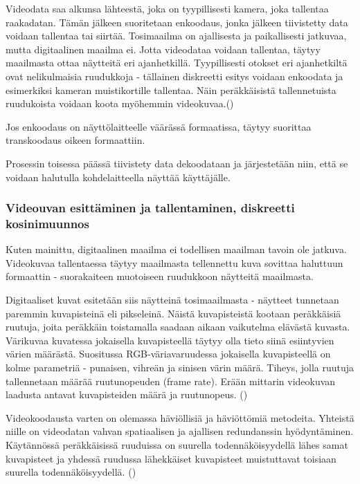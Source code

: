 Videodata saa alkunsa lähteestä, joka on tyypillisesti kamera, joka tallentaa
raakadatan. Tämän jälkeen suoritetaan enkoodaus, jonka jälkeen tiivistetty data
voidaan tallentaa tai siirtää. Tosimaailma on ajallisesta ja paikallisesti jatkuvaa,
mutta digitaalinen maailma ei. Jotta videodataa voidaan tallentaa, täytyy
maailmasta ottaa näytteitä eri ajanhetkillä. Tyypillisesti otokset eri ajanhetkiltä
ovat nelikulmaisia ruudukkoja - tällainen diskreetti esitys voidaan enkoodata
ja esimerkiksi kameran muistikortille tallentaa. Näin peräkkäisistä tallennetuista
ruudukoista voidaan koota myöhemmin videokuvaa.(\cite{h264})

Jos enkoodaus on näyttölaitteelle väärässä
formaatissa, täytyy suorittaa transkoodaus oikeen formaattiin.

Prosessin toisessa päässä tiivistety data dekoodataan ja järjestetään niin, että
se voidaan halutulla kohdelaitteella näyttää käyttäjälle.

\subsubsection{Videouvan esittäminen ja tallentaminen, diskreetti kosinimuunnos}

Kuten mainittu, digitaalinen maailma ei todellisen maailman tavoin ole jatkuva.
Videokuvaa tallentaessa täytyy maailmasta tellennettu kuva sovittaa haluttuun
formaattin - suorakaiteen muotoiseen ruudukkoon näytteitä maailmasta.

Digitaaliset kuvat esitetään siis näytteinä tosimaailmasta - näytteet tunnetaan
paremmin kuvapisteinä eli pikseleinä.
Näistä kuvapisteistä kootaan peräkkäisiä ruutuja, joita peräkkäin toistamalla
saadaan aikaan vaikutelma elävästä kuvasta.
Värikuvaa kuvatessa jokaisella kuvapisteellä täytyy olla tieto siinä esiintyvien
värien määrästä. Suositussa RGB-väriavaruudessa jokaisella kuvapisteellä on
kolme parametriä - punaisen, vihreän ja sinisen värin määrä. Tiheys, jolla
ruutuja tallennetaan määrää ruutunopeuden (frame rate). Erään mittarin
videokuvan laadusta antavat kuvapisteiden määrä ja ruutunopeus. (\cite{h264})

Videokoodausta varten on olemassa häviöllisiä ja häviöttömiä metodeita.
Yhteistä niille on videodatan vahvan spatiaalisen ja ajallisen redundanssin
hyödyntäminen. Käytännössä peräkkäisissä ruuduissa on suurella
todennäköisyydellä lähes samat kuvapisteet ja yhdessä ruudussa lähekkäiset
kuvapisteet muistuttavat toisiaan suurella todennäköisyydellä. (\cite{h264})


